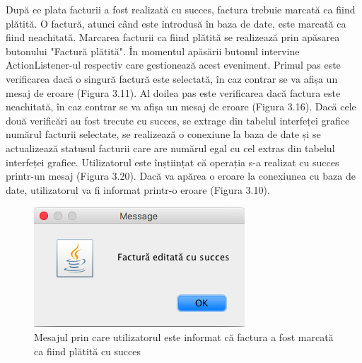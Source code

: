 \documentclass[12pt]{book}
\begin{document}
După ce plata facturii a fost realizată cu succes, factura trebuie marcată ca fiind plătită. O factură, atunci când este introdusă în baza de date, este marcată ca fiind neachitată. Marcarea facturii ca fiind plătită se realizează prin apăsarea butonului "Factură plătită". În momentul apăsării butonul intervine ActionListener-ul respectiv care gestionează acest eveniment. Primul pas este verificarea dacă o singură factură este selectată, în caz contrar se va afișa un mesaj de eroare (Figura 3.11). Al doilea pas este verificarea dacă factura este neachitată, în caz contrar se va afișa un mesaj de eroare (Figura 3.16). Dacă cele două verificări au fost trecute cu succes, se extrage din tabelul interfeței grafice numărul facturii selectate, se realizează o conexiune la baza de date și se actualizează statusul facturii care are numărul egal cu cel extras din tabelul interfeței grafice. Utilizatorul este înștiințat că operația s-a realizat cu succes printr-un mesaj (Figura 3.20). Dacă va apărea o eroare la conexiunea cu baza de date, utilizatorul va fi informat printr-o eroare (Figura 3.10).

\begin{figure}[!ht]
	\centering
	\includegraphics{EditareSucces}
	\caption{Mesajul prin care utilizatorul este informat că factura a fost marcată ca fiind plătită cu succes}
\end{figure}
\end{document}
